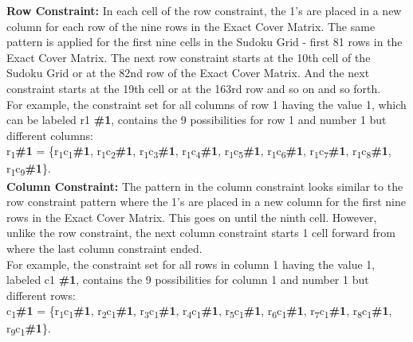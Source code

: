 \documentclass[a4paper,oneside,11pt]{report}
\newcounter{row}
\newcounter{col}
\begin{document}
\textbf{Row Constraint:} In each cell of the row constraint, the 1’s are placed in a new column for each row of the nine rows in the Exact Cover Matrix. The same pattern is applied for the first nine cells in the Sudoku Grid - first 81 rows in the Exact Cover Matrix. The next row constraint starts at the 10th cell of the Sudoku Grid or at the 82nd row of the Exact Cover Matrix. And the next constraint starts at the 19th cell or at the 163rd row and so on and so forth.\\
For example, the constraint set for all columns of row 1 having the value 1, which can be labeled r1 \textbf{\#1}, contains the 9 possibilities for row 1 and number 1 but different columns:\\
r\textsubscript{1}\textbf{\#1} = \{r\textsubscript{1}c\textsubscript{1}\textbf{\#1}, r\textsubscript{1}c\textsubscript{2}\textbf{\#1}, r\textsubscript{1}c\textsubscript{3}\textbf{\#1}, r\textsubscript{1}c\textsubscript{4}\textbf{\#1}, r\textsubscript{1}c\textsubscript{5}\textbf{\#1}, r\textsubscript{1}c\textsubscript{6}\textbf{\#1}, r\textsubscript{1}c\textsubscript{7}\textbf{\#1}, r\textsubscript{1}c\textsubscript{8}\textbf{\#1}, r\textsubscript{1}c\textsubscript{9}\textbf{\#1}\}.\\

\textbf{Column Constraint:} The pattern in the column constraint looks similar to the row constraint pattern where the 1’s are placed in a new column for the first nine rows in the Exact Cover Matrix. This goes on until the ninth cell. However, unlike the row constraint, the next column constraint starts 1 cell forward from where the last column constraint ended.\\

For example, the constraint set for all rows in column 1 having the value 1, labeled c1 \textbf{\#1}, contains the 9 possibilities for column 1 and number 1 but different rows:\\
c\textsubscript{1}\textbf{\#1} = \{r\textsubscript{1}c\textsubscript{1}\textbf{\#1}, r\textsubscript{2}c\textsubscript{1}\textbf{\#1}, r\textsubscript{3}c\textsubscript{1}\textbf{\#1}, r\textsubscript{4}c\textsubscript{1}\textbf{\#1}, r\textsubscript{5}c\textsubscript{1}\textbf{\#1}, r\textsubscript{6}c\textsubscript{1}\textbf{\#1}, r\textsubscript{7}c\textsubscript{1}\textbf{\#1}, r\textsubscript{8}c\textsubscript{1}\textbf{\#1}, r\textsubscript{9}c\textsubscript{1}\textbf{\#1}\}.\\
\end{document}
